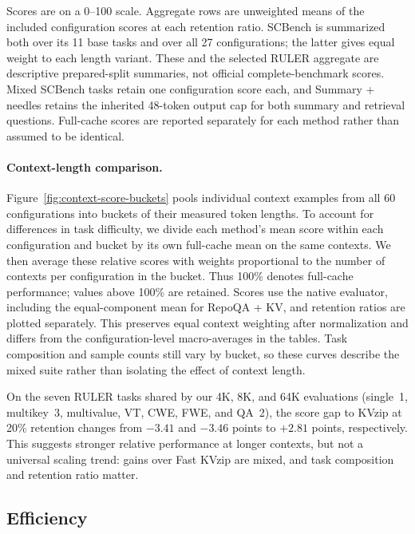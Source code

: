 \documentclass{article} %
\begin{document}
Scores are on a 0--100 scale. Aggregate rows are unweighted means of the
included configuration scores at each retention ratio. SCBench is summarized
both over its 11 base tasks and over all 27 configurations; the latter gives
equal weight to each length variant. These and the selected RULER aggregate
are descriptive prepared-split summaries, not official complete-benchmark
scores. Mixed SCBench tasks retain one configuration score each, and
Summary + needles retains the inherited 48-token output cap for both summary
and retrieval questions. Full-cache scores are
reported separately for each method rather than assumed to be identical.

\paragraph{Context-length comparison.}
Figure~\ref{fig:context-score-buckets} pools individual context examples
from all 60 configurations into buckets of their measured token lengths.
To account for differences in task difficulty, we divide each method's
mean score within each configuration and bucket by its own full-cache mean
on the same contexts. We then average these relative scores with weights
proportional to the number of contexts per configuration in the bucket.
Thus 100\% denotes full-cache performance; values above 100\% are retained.
Scores use the native evaluator, including the equal-component mean for
RepoQA + KV, and retention ratios are plotted separately. This preserves
equal context weighting after normalization and differs from the
configuration-level macro-averages in the tables. Task composition and
sample counts still vary by bucket, so these curves describe the mixed
suite rather than isolating the effect of context length.

On the seven RULER tasks shared by our 4K, 8K, and 64K evaluations
(single~1, multikey~3, multivalue, VT, CWE, FWE, and QA~2), the score gap
to KVzip at 20\% retention changes from $-3.41$ and $-3.46$ points to
$+2.81$ points, respectively. This suggests stronger relative performance
at longer contexts, but not a universal scaling trend: gains over Fast
KVzip are mixed, and task composition and retention ratio matter.



\subsection{Efficiency}
\end{document}
